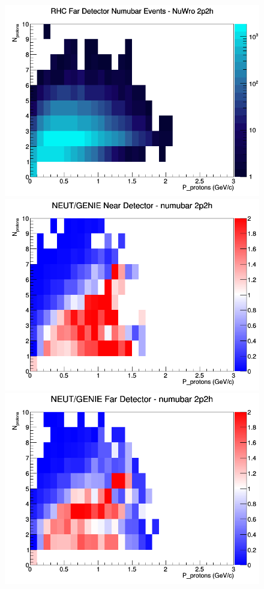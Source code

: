 \begin{figure}[h]
\endminipage
{}
\includegraphics[width=\linewidth]{N_P/nominal/protons/2p2h_RHC_FD_numubar_N_P_NuWro.png}
\endminipage
\newline
{}
\includegraphics[width=\linewidth]{N_P/nominal/protons/ratios/2p2h_NEUT_GENIE_numubar_near_N_P.png}
\endminipage
{}
\includegraphics[width=\linewidth]{N_P/nominal/protons/ratios/2p2h_NEUT_GENIE_numubar_far_N_P.png}

\end{figure}
